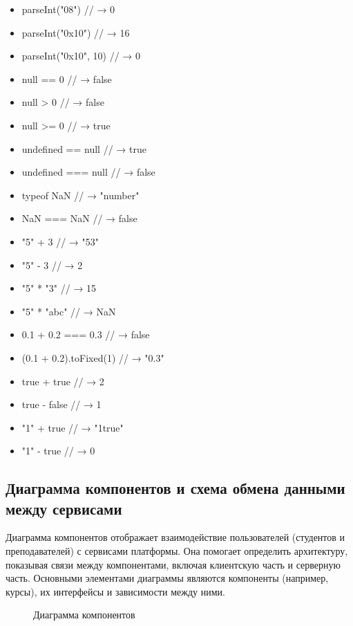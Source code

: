 \begin{itemize}
  \item parseInt("08") // → 0
  \item parseInt("0x10") // → 16
  \item parseInt("0x10", 10) // → 0
  \item null == 0 // → false
  \item null > 0 // → false
  \item null >= 0 // → true
  \item undefined == null // → true
  \item undefined === null // → false
  \item typeof NaN // → "number"
  \item NaN === NaN // → false
  \item "5" + 3 // → "53"
  \item "5" - 3 // → 2
  \item "5" * "3" // → 15
  \item "5" * "abc" // → NaN
  \item 0.1 + 0.2 === 0.3 // → false
  \item (0.1 + 0.2).toFixed(1) // → "0.3"
  \item true + true // → 2
  \item true - false // → 1
  \item "1" + true // → "1true"
  \item "1" - true // → 0
\end{itemize}



\subsection{Диаграмма компонентов и схема обмена данными между сервисами}

Диаграмма компонентов отображает взаимодействие пользователей (студентов и преподавателей) с сервисами платформы. Она помогает определить архитектуру, показывая связи между компонентами, включая клиентскую часть и серверную часть. Основными элементами диаграммы являются компоненты (например, курсы), их интерфейсы и зависимости между ними.

\begin{figure}[ht]
\caption{Диаграмма компонентов}
\label{comp:image}
\end{figure}

